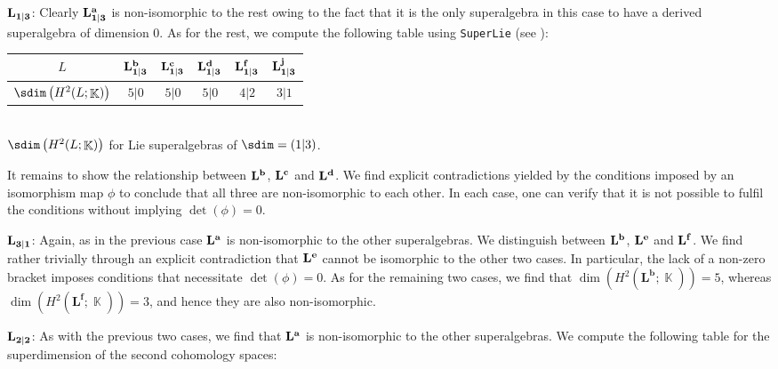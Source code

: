 \documentclass[12pt]{amsart}
\DeclareMathOperator{\K}{\mathbb{K}}
\begin{document}
{\vspace{0.5 em}

\underline{$\bf L_{1|3}$}: Clearly $\bf L^a_{1|3}$ is non-isomorphic to the rest owing to the fact that it is the only superalgebra in this case to have a derived superalgebra of dimension 0. As for the rest, we compute the following table using \texttt{SuperLie} (see \cite{Kr}): 

\vspace{0.5 em}

{\renewcommand{\arraystretch}{1.5}
\footnotesize
\begin{center}
    \begin{tabular}{|c|c|c|c|c|c|}
    \hline
        $L$ & ${\bf L^b_{1|3}}$ & ${\bf L^c_{1|3}}$ & ${\bf L^d_{1|3}}$ & ${\bf L^f_{1|3}}$ & ${\bf L^j_{1|3}}$ \\\hline
        $\sdim\left(H^2(L;\K)\right)$ & $5|0$ & $5|0$ & $5|0$ & $4|2$ & $3|1$ \\\hline
    \end{tabular}
    \\[1em]
    $\sdim\left(H^2(L;\K)\right)$ for Lie superalgebras of $\sdim=(1|3)$.
\end{center}}
\normalsize
\vspace{0.2 em}

It remains to show the relationship between $\bf L^b$, $\bf L^c$ and $\bf L^d$. We find explicit contradictions yielded by the conditions imposed by an isomorphism map $\phi$ to conclude that all three are non-isomorphic to each other. In each case, one can verify that it is not possible to fulfil the conditions without implying $\det(\phi)=0$. 

\vspace{0.5 em}

\underline{$\bf L_{3|1}$}: Again, as in the previous case $\bf L^a$ is non-isomorphic to the other superalgebras. We distinguish between $\bf L^b$, $\bf L^e$ and $\bf L^f$. We find rather trivially through an explicit contradiction that $\bf L^e$ cannot be isomorphic to the other two cases. In particular, the lack of a non-zero bracket imposes conditions that necessitate $\det(\phi)=0$. As for the remaining two cases, we find that $\dim\left(H^2(\mathbf{L^b};\K)\right)=5$, whereas $\dim\left(H^2(\mathbf{L^f};\K)\right)=3$, and hence they are also non-isomorphic.

\vspace{0.5 em}

\underline{$\bf L_{2|2}$}: As with the previous two cases, we find that $\bf L^a$ is non-isomorphic to the other superalgebras. We compute the following table for the superdimension of the second cohomology spaces: 

}
\end{document}

